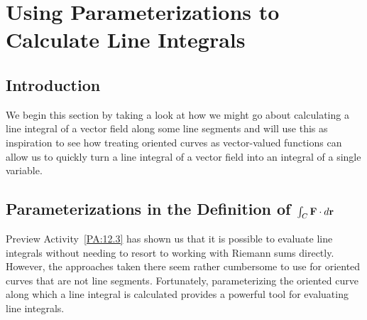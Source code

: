 \section{Using Parameterizations to Calculate Line Integrals} \label{S:12.3.ParamLineIntegrals}


\vspace*{-14 pt}

\subsection*{Introduction}

We begin this section by taking a look at how we might go about
calculating a line integral of a vector field along some line segments
and will use this as inspiration to see how treating oriented curves
as vector-valued functions can allow us to quickly turn a line
integral of a vector field into an integral of a single variable. 



\subsection*{Parameterizations in the Definition of $\int_C\mathbf{F}\cdot d\mathbf{r}$}

Preview Activity~\ref{PA:12.3} has shown us that it is possible to
evaluate line integrals without needing to resort to working with
Riemann sums directly. However, the approaches taken there seem rather
cumbersome to use for oriented curves that are not line
segments. Fortunately, parameterizing the oriented curve along which a
line integral is calculated provides a powerful tool for evaluating
line integrals.

